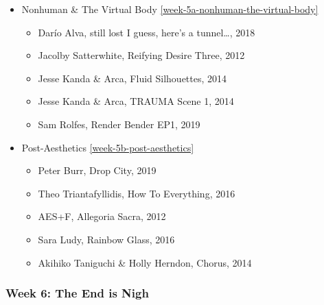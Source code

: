 \documentclass[10pt,letter,english]{article}
\begin{document}
\begin{itemize}
      \item
            Nonhuman \& The Virtual Body \ref{week-5a-nonhuman-the-virtual-body}

            \begin{itemize}
                  \item
                        Darío Alva, still lost I guess, here's a tunnel\ldots, 2018
                  \item
                        Jacolby Satterwhite, Reifying Desire Three, 2012
                  \item
                        Jesse Kanda \& Arca, Fluid Silhouettes, 2014
                  \item
                        Jesse Kanda \& Arca, TRAUMA Scene 1, 2014
                  \item
                        Sam Rolfes, Render Bender EP1, 2019
            \end{itemize}
      \item
            Post-Aesthetics \ref{week-5b-post-aesthetics}

            \begin{itemize}
                  \item
                        Peter Burr, Drop City, 2019
                  \item
                        Theo Triantafyllidis, How To Everything, 2016
                  \item
                        AES+F, Allegoria Sacra, 2012
                  \item
                        Sara Ludy, Rainbow Glass, 2016
                  \item
                        Akihiko Taniguchi \& Holly Herndon, Chorus, 2014
            \end{itemize}
\end{itemize}


\clearpage
\hypertarget{week-6-the-end-is-nigh}{%
      \subsubsection{Week 6: The End is Nigh}\label{week-6-the-end-is-nigh}}
\end{document}
